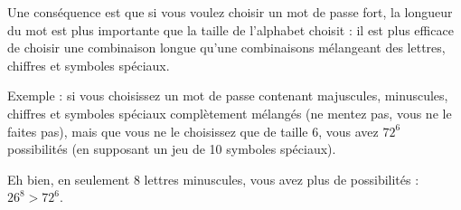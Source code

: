 \begin{normaltext}
    Une conséquence est que si vous voulez choisir un mot de passe fort, la longueur du mot est plus importante que la taille de l'alphabet choisit : il est plus efficace de choisir une combinaison longue qu'une combinaisons mélangeant des lettres, chiffres et symboles spéciaux.
    
    Exemple : si vous choisissez un mot de passe contenant majuscules, minuscules, chiffres et symboles spéciaux complètement mélangés (ne mentez pas, vous ne le faites pas), mais que vous ne le choisissez que de taille \( 6\), vous avez \( 72^6\) possibilités (en supposant un jeu de 10 symboles spéciaux).

    Eh bien, en seulement \( 8\) lettres minuscules, vous avez plus de possibilités : \( 26^8>72^6\).
\end{normaltext}

